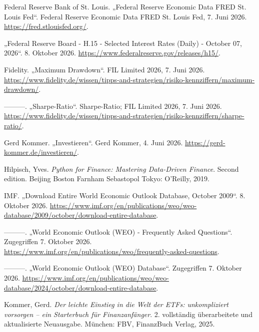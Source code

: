 \documentclass[
  ngerman,
  a4paper,
  DIV=11,
  oneside]{scrreprt}
\newlength{\cslhangindent}
\newenvironment{CSLReferences}[2] %
 {\begin{list}{}{%
  \setlength{\itemindent}{0pt}
  \setlength{\leftmargin}{0pt}
  \setlength{\parsep}{0pt}
  \ifodd #1
   \setlength{\leftmargin}{\cslhangindent}
   \setlength{\itemindent}{-1\cslhangindent}
  \fi
  \setlength{\itemsep}{#2\baselineskip}}}
 {\end{list}}
\begin{document}
\begin{CSLReferences}{1}{1}
Federal Reserve Bank of St. Louis. {„Federal {Reserve Economic Data}
\textbar{} {FRED} \textbar{} {St}. {Louis Fed}``}. Federal Reserve
Economic Data \textbar{} FRED \textbar{} St. Louis Fed, 7. Juni 2026.
\url{https://fred.stlouisfed.org/}.

{„Federal {Reserve Board} - {H}.15 - {Selected Interest Rates} ({Daily})
- {October} 07, 2026``}. 8. Oktober 2026.
\url{https://www.federalreserve.gov/releases/h15/}.

Fidelity. {„Maximum {Drawdown}``}. FIL Limited 2026, 7. Juni 2026.
\url{https://www.fidelity.de/wissen/tipps-and-strategien/risiko-kennziffern/maximum-drawdown/}.

---------. {„Sharpe-{Ratio}``}. Sharpe-Ratio; FIL Limited 2026, 7. Juni
2026.
\url{https://www.fidelity.de/wissen/tipps-and-strategien/risiko-kennziffern/sharpe-ratio/}.

Gerd Kommer. {„Investieren``}. Gerd Kommer, 4. Juni 2026.
\url{https://gerd-kommer.de/investieren/}.

Hilpisch, Yves. \emph{Python for Finance: Mastering Data-Driven
Finance}. Second edition. Beijing Boston Farnham Sebastopol Tokyo:
O'Reilly, 2019.

IMF. {„Download Entire {World Economic Outlook} Database, {October}
2009``}. 8. Oktober 2026.
\url{https://www.imf.org/en/publications/weo/weo-database/2009/october/download-entire-database}.

---------. {„World {Economic Outlook} ({WEO}) - {Frequently Asked
Questions}``}. Zugegriffen 7. Oktober 2026.
\url{https://www.imf.org/en/publications/weo/frequently-asked-questions}.

---------. {„World {Economic Outlook} ({WEO}) {Database}``}. Zugegriffen
7. Oktober 2026.
\url{https://www.imf.org/en/publications/weo/weo-database/2024/october/download-entire-database}.

Kommer, Gerd. \emph{Der leichte Einstieg in die Welt der ETFs:
unkompliziert vorsorgen -- ein Starterbuch für Finanzanfänger}. 2.
vollständig überarbeitete und aktualisierte Neuausgabe. München: FBV,
FinanzBuch Verlag, 2025.


\end{CSLReferences}
\end{document}
